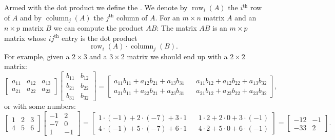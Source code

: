 Armed with the dot product we define the
\emph{}.
We denote by $\operatorname{row}_i(A)$ the $i^{\text{th}}$ row
of $A$ and by
$\operatorname{column}_j(A)$ the $j^{\text{th}}$ column of $A$.
For an $m \times n$ matrix $A$ and an $n \times p$ matrix $B$
we can compute the product $AB$:  The matrix $AB$ is an $m \times p$
matrix whose $ij^{\text{th}}$ entry is the dot product
\begin{equation*}
\operatorname{row}_i(A) \cdot
\operatorname{column}_j(B) .
\end{equation*}
For example, given a $2 \times 3$ and a $3 \times 2$ matrix
we should end up with a $2 \times 2$ matrix:
\begin{equation} \label{linalg:eqmatrixmulex}
\begin{bmatrix}
a_{11} & a_{12} & a_{13} \\
a_{21} & a_{22} & a_{23}
\end{bmatrix}
\begin{bmatrix}
b_{11} & b_{12} \\
b_{21} & b_{22} \\
b_{31} & b_{32}
\end{bmatrix}
=
\begin{bmatrix}
a_{11} b_{11} + 
a_{12} b_{21} + 
a_{13} b_{31} & &
a_{11} b_{12} + 
a_{12} b_{22} + 
a_{13} b_{32} \\
a_{21} b_{11} + 
a_{22} b_{21} + 
a_{23} b_{31} & &
a_{21} b_{12} + 
a_{22} b_{22} + 
a_{23} b_{32}
\end{bmatrix} ,
\end{equation}
or with some numbers:
\begin{equation*}
\begin{bmatrix}
1 & 2 & 3 \\
4 & 5 & 6
\end{bmatrix}
\begin{bmatrix}
-1 & 2 \\
-7 & 0 \\
1 & -1
\end{bmatrix}
=
\begin{bmatrix}
1\cdot (-1) + 2\cdot (-7) + 3 \cdot 1 &  &
1\cdot 2 + 2\cdot 0 + 3 \cdot (-1) \\
4\cdot (-1) + 5\cdot (-7) + 6 \cdot 1 &  &
4\cdot 2 + 5\cdot 0 + 6 \cdot (-1)
\end{bmatrix}
=
\begin{bmatrix}
-12 & -1 \\
-33 & 2
\end{bmatrix} .
\end{equation*}

